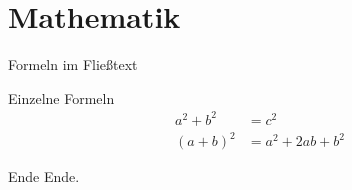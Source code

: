 \documentclass[aspectratio=169, ngerman]{beamer}
\begin{document}
	\section{Mathematik}

	\begin{frame}{Formeln im Fließtext}
		\blindmathtrue
		\Blindtext[1][5]
		\blindmathfalse
	\end{frame}

	\begin{frame}{Einzelne Formeln}
		\begin{align}
			a^2 + b^2 &= c^2\\
			(a+b)^2 &= a^2 + 2ab + b^2
		\end{align}
	\end{frame}

	\begin{frame}[plain]{Ende}
		\Huge{Ende.}
	\end{frame}
\end{document}
